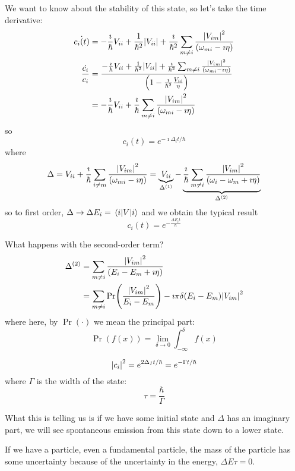 \documentclass[a4paper,twoside,master.tex]{subfiles}
\begin{document}
We want to know about the stability of this state, so let's take the time derivative:
\begin{align}
    \dot{c_i(t)} &= - \frac{\imath}{\hbar} V_{ii} + \frac{1}{\hbar^2} \abs{V_{ii}} + \frac{\imath}{\hbar^2} \sum_{m \neq i} \frac{\abs{V_{im}}^2}{(\omega_{mi} - \imath \eta)} \\
    \frac{\dot{c_i}}{c_i} &= \frac{- \frac{\imath}{\hbar} V_{ii} + \frac{1}{\hbar^2} \abs{V_{ii}} + \frac{\imath}{\hbar^2} \sum_{m \neq i} \frac{\abs{V_{im}}^2}{(\omega_{mi} - \imath \eta)}}{\left( 1- \frac{\imath}{\hbar^2} \frac{V_{ii}}{\eta} \right)} \\
    &= - \frac{\imath}{\hbar} V_{ii} + \frac{\imath}{\hbar} \sum_{m \neq i} \frac{\abs{V_{im}}^2}{(\omega_{mi} - \imath \eta)}
\end{align}
so
\begin{equation}
    c_i(t) = e^{- \imath \Delta_i t / \hbar}
\end{equation}
where
\begin{equation}
    \Delta = V_{ii} + \frac{\imath}{\hbar} \sum_{i \neq m} \frac{\abs{V_{im}}^2}{(\omega_{mi} - \imath \eta)} = \underbrace{V_{ii}}_{\Delta^{(1)}} - \underbrace{\frac{\imath}{\hbar} \sum_{m \neq i} \frac{\abs{V_{im}}^2}{(\omega_i - \omega_m + \imath \eta)}}_{\Delta^{(2)}}
\end{equation}
so to first order, $ \Delta \to \Delta E_i = \mel{i}{V}{i} $ and we obtain the typical result
\begin{equation}
    c_i(t) = e^{- \frac{\Delta E_i t}{\hbar}}
\end{equation}

What happens with the second-order term?
\begin{align}
    \Delta^{(2)} &= \sum_{m \neq i} \frac{\abs{V_{im}}^2}{(E_i - E_m + \imath \eta)} \\
    &= \sum_{m \neq i} \Pr(\frac{\abs{V_{im}}^2}{E_i -E_m}) - \imath \pi \delta(E_i - E_m) \abs{V_{im}}^2
\end{align}
where here, by $ \Pr( \cdot) $ we mean the principal part:
\begin{equation}
    \Pr(f(x)) = \lim_{\delta \to 0} \int_{- \infty}^{\delta} f(x) 
\end{equation}

\begin{equation}
    \abs{c_i}^2 = e^{2 \Delta_I t / \hbar} = e^{- \Gamma t / \hbar}
\end{equation}
where $ \Gamma $ is the width of the state:
\begin{equation}
    \tau = \frac{\hbar}{\Gamma}
\end{equation}

What this is telling us is if we have some initial state and $ \Delta $ has an imaginary part, we will see spontaneous emission from this state down to a lower state.

If we have a particle, even a fundamental particle, the mass of the particle has some uncertainty because of the uncertainty in the energy, $ \Delta E \tau = 0 $.
\end{document}
